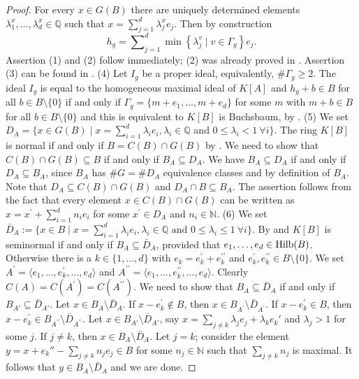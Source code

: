 \documentclass[11pt,a4paper]{amsart}%
\theoremstyle{definition}
\theoremstyle{remark}
\numberwithin{equation}{section}
\theoremstyle{plain}
\begin{document}
\begin{proof}


For every $x\in G(B)$ there are uniquely determined elements $\lambda_{1}^{x},\ldots,\lambda_{d}^{x}
\in\mathbb{Q}$ such that $x=\sum_{j=1}^{d}\lambda_{j}^{x}e_{j}$. Then by construction
\[
h_{g}=\sum\nolimits_{j=1}^{d}\min\left\{ \lambda^{v}_{j}\mid v\in\Gamma_{g}\right\} e_{j}.
\]
Assertion (1) and (2) follow immediately; (2) was already proved in \cite[Theorem\,6.4]{RSHFGA}. Assertion (3) can be found in \cite[Corollary\,6.5]{RSHFGA}.\smallskip\newline
(4) Let $I_g$ be a proper ideal, equivalently, $\#\Gamma_g\geq2$. The ideal $I_g$ is equal to the homogeneous maximal ideal of $K[A]$ and $h_g+b\in B$ for all $b\in B\setminus\{0\}$ if and only if $\Gamma_g=\{m+e_{1},\ldots,m+e_{d}\}$ for some $m$ with $m+b\in B$ for all $b\in B\setminus\{0\}$ and this is equivalent to $K[B]$ is Buchsbaum, by \cite[Theorem\,9]{GSRBB}.\smallskip\newline
(5) We set $D_{A}=\{x\in G\left(  B\right)  \mid x=\sum_{i=1}^{d}\lambda_{i}%
e_{i},\lambda_{i}\in\mathbb{Q}$ and $0\leq\lambda_{i}<1~\forall i\}$. The ring $K[B]$ is normal if and only if $B=C(B)\cap G(B)$ by \cite[Proposition\,1]{MHCM}. We need to show that $C(B)\cap G(B)\subseteq B$ if and only if $B_A\subseteq D_A$. We have $B_{A}\subseteq D_{A}$ if and only if $D_{A}\subseteq B_{A}$, since $B_{A}$ has $\#G=\#D_{A}$ equivalence classes and by definition of $B_{A}$. Note that $D_{A}\subseteq C(B)\cap G(B)$ and $D_{A}\cap B\subseteq B_{A}$. The assertion follows from the fact that every element $x\in C(B)\cap G(B)$ can be written as $x=x^{\prime}+\sum_{i=1}^{d}n_{i}e_{i}$ for some $x^{\prime}\in D_{A}$ and $n_{i}\in\mathbb{N}$.\smallskip\newline
(6) We set $\bar D_{A}:=\{x\in B \mid x =\sum_{i=1}^{d} \lambda_{i}e_{i}, \lambda_{i}\in\mathbb{Q }\mbox{ and }0\leq\lambda_{i}\leq1~\forall i\}$. By \cite[Proposition\,5.32]{HRLC} and \cite[Theorem\,4.1.1]{PHDPL} $K[B]$ is seminormal if and only if $B_A\subseteq\bar D_A$, provided that ${e_{1},\ldots,e_{d}}\in{\rm Hilb}(B)$. Otherwise there is a $k\in\{1,\ldots,d\}$ with $e_{k}=e_{k}^{\prime}+e_{k}^{\prime\prime}$ and $e_{k}^{\prime},e_{k}^{\prime\prime}\in B\setminus\{0\}$. We set $A^{\prime}=\langle e_{1},\ldots,e_{k}^{\prime},\ldots,e_{d}\rangle$ and $A^{\prime\prime}=\langle e_{1},\ldots,e_{k}^{\prime\prime},\ldots,e_{d}\rangle$. Clearly $C(A)=C(A^{\prime})=C(A^{\prime\prime})$. We need to show that $B_A\subseteq \bar D_A$ if and only if $B_{A'}\subseteq \bar D_{A'}$.  Let $x\in B_{A}\setminus\bar D_{A}$. If $x-e_{k}^{\prime}\notin B$, then $x\in B_{A^{\prime}}\setminus\bar D_{A^{\prime}}$. If $x-e_{k}^{\prime}\in B$, then $x-e_{k}^{\prime}\in B_{A^{\prime\prime}}\setminus\bar D_{A^{\prime\prime}}$. Let $x\in B_{A'}\setminus \bar D_{A'}$, say $x=\sum _{j\not=k}\lambda_je_j+\lambda_ke_k'$ and $\lambda_j>1$ for some $j$. If $j\not=k$, then $x\in B_A\setminus \bar D_A$. Let $j=k$; consider the element $y=x+e_{k}''-\sum_{j\not=k}n_je_j\in B$ for some $n_j\in \mathbb N$ such that $\sum_{j\not=k} n_j$ is maximal. It follows that $y\in B_A\setminus\bar D_A$ and we are done.
\end{proof}
\end{document}
